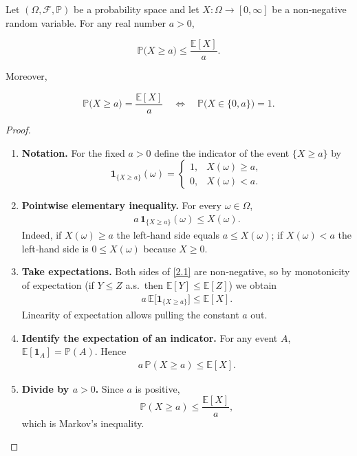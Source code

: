\begin{theorem}
Let \((\Omega,\mathcal F,\mathbb P)\) be a probability space and let
\(X:\Omega\to[0,\infty]\) be a non‑negative random variable.  
For any real number \(a>0\),

\[
\mathbb P\bigl(X\ge a\bigr)\le \frac{\mathbb E[X]}{a}.
\]

Moreover,

\[
\mathbb P\bigl(X\ge a\bigr)=\frac{\mathbb E[X]}{a}
\quad\Longleftrightarrow\quad
\mathbb P\bigl(X\in\{0,a\}\bigr)=1 .
\]
\end{theorem}

\begin{proof}
\begin{enumerate}
\item \textbf{Notation.}  
For the fixed \(a>0\) define the indicator of the event \(\{X\ge a\}\) by
\[
\mathbf 1_{\{X\ge a\}}(\omega)=
\begin{cases}
1, & X(\omega)\ge a,\\[2pt]
0, & X(\omega)< a .
\end{cases}
\]

\item \textbf{Pointwise elementary inequality.}  
For every \(\omega\in\Omega\),
\begin{align}
a\,\mathbf 1_{\{X\ge a\}}(\omega)\le X(\omega). \tag{2.1}
\end{align}
Indeed, if \(X(\omega)\ge a\) the left‑hand side equals \(a\le X(\omega)\);  
if \(X(\omega)<a\) the left‑hand side is \(0\le X(\omega)\) because \(X\ge0\).

\item \textbf{Take expectations.}  
Both sides of \eqref{2.1} are non‑negative, so by monotonicity of expectation
(if \(Y\le Z\) a.s.\ then \(\mathbb E[Y]\le\mathbb E[Z]\)) we obtain
\begin{align}
a\,\mathbb E\!\bigl[\mathbf 1_{\{X\ge a\}}\bigr]\le\mathbb E[X]. \tag{3.1}
\end{align}
Linearity of expectation allows pulling the constant \(a\) out.

\item \textbf{Identify the expectation of an indicator.}  
For any event \(A\), \(\mathbb E[\mathbf 1_A]=\mathbb P(A)\).  Hence
\begin{align}
a\,\mathbb P(X\ge a)\le\mathbb E[X]. \tag{4.1}
\end{align}

\item \textbf{Divide by \(a>0\).}  
Since \(a\) is positive,
\[
\mathbb P(X\ge a)\le\frac{\mathbb E[X]}{a},
\]
which is Markov’s inequality.


\end{enumerate}
\end{proof}
